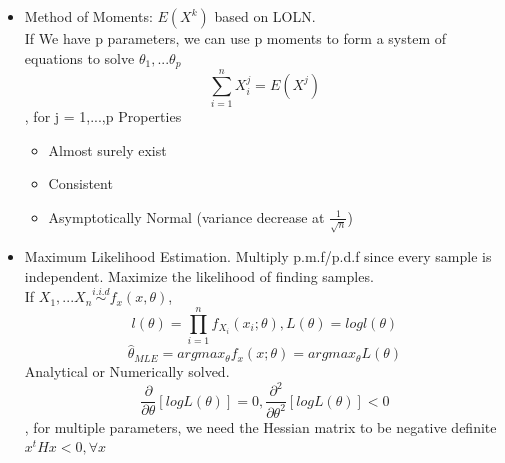 \documentclass[11pt, openany]{book}              %
\begin{document}
\begin{itemize}
    \item Method of Moments: $E(X^k)$ based on LOLN.\\ 
    	If We have p parameters, we can use p moments to form a system of equations to solve $\theta_1,...\theta_p$
    	$$\sum_{i=1}^n X_i^j= E(X^j)$$, for j = 1,...,p
    	Properties 
    	\begin{itemize}
    		\item Almost surely exist
    		\item Consistent
    		\item Asymptotically Normal (variance decrease at $\frac{1}{\sqrt{n}}$)
    	\end{itemize}
    \item Maximum Likelihood Estimation. Multiply p.m.f/p.d.f since every sample is independent. Maximize the likelihood of finding samples. \\ If $X_1,...X_n \stackrel{i.i.d}{\sim} f_x(x, \theta)$, 
    	$$ l(\theta) =  \prod_{i=1}^n f_{X_i} (x_i; \theta), L(\theta ) = log l(\theta)$$
    	$$ \hat{\theta}_{MLE}= argmax_{\theta} f_x(x;\theta ) = argmax_{\theta} L(\theta )$$
    	Analytical or Numerically solved. $$ \frac{\partial}{\partial \theta} [log L(\theta ) ] = 0, \frac{\partial^2}{\partial \theta^2} [log L(\theta ) ] < 0$$, for multiple parameters, we need the Hessian matrix to be negative definite $x^tHx<0, \forall x$ 
    	

\end{itemize}
\end{document}
